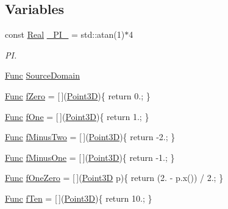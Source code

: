 \subsection*{Variables}
\begin{DoxyCompactItemize}
\item 
const \hyperlink{namespaceFVCode3D_a40c1f5588a248569d80aa5f867080e83}{Real} \hyperlink{namespaceFVCode3D_a10917df7e49a48239ce5f00ec9bbfe0a}{\+\_\+\+P\+I\+\_\+} = std\+::atan(1)$\ast$4
\begin{DoxyCompactList}\small\item\em PI. \end{DoxyCompactList}\item 
\hyperlink{namespaceFVCode3D_a38fa3b2520ad364d2c3d56ea5077826a}{Func} \hyperlink{namespaceFVCode3D_ae98a1f1ab0fce8db57176a4a9f91b2d0}{Source\+Domain}
\item 
\hyperlink{namespaceFVCode3D_a38fa3b2520ad364d2c3d56ea5077826a}{Func} \hyperlink{namespaceFVCode3D_a2e72cc81c6f214d6e057af7a02599501}{f\+Zero} = \mbox{[}$\,$\mbox{]}(\hyperlink{classFVCode3D_1_1Point3D}{Point3D})\{ return 0.; \}
\item 
\hyperlink{namespaceFVCode3D_a38fa3b2520ad364d2c3d56ea5077826a}{Func} \hyperlink{namespaceFVCode3D_a1a9ede09c77441d292a079fbab60fb82}{f\+One} = \mbox{[}$\,$\mbox{]}(\hyperlink{classFVCode3D_1_1Point3D}{Point3D})\{ return 1.; \}
\item 
\hyperlink{namespaceFVCode3D_a38fa3b2520ad364d2c3d56ea5077826a}{Func} \hyperlink{namespaceFVCode3D_aafe19d9d844e6d7ec5cc316a921b91ea}{f\+Minus\+Two} = \mbox{[}$\,$\mbox{]}(\hyperlink{classFVCode3D_1_1Point3D}{Point3D})\{ return -\/2.; \}
\item 
\hyperlink{namespaceFVCode3D_a38fa3b2520ad364d2c3d56ea5077826a}{Func} \hyperlink{namespaceFVCode3D_a2ce53aebcf9d64490c1d10fff4860a75}{f\+Minus\+One} = \mbox{[}$\,$\mbox{]}(\hyperlink{classFVCode3D_1_1Point3D}{Point3D})\{ return -\/1.; \}
\item 
\hyperlink{namespaceFVCode3D_a38fa3b2520ad364d2c3d56ea5077826a}{Func} \hyperlink{namespaceFVCode3D_a05f5ace5c7eed4784717659f36b087fe}{f\+One\+Zero} = \mbox{[}$\,$\mbox{]}(\hyperlink{classFVCode3D_1_1Point3D}{Point3D} p)\{ return (2. -\/ p.\+x()) / 2.; \}
\item 
\hyperlink{namespaceFVCode3D_a38fa3b2520ad364d2c3d56ea5077826a}{Func} \hyperlink{namespaceFVCode3D_ab998dd309f7a549b31ae669513c2039d}{f\+Ten} = \mbox{[}$\,$\mbox{]}(\hyperlink{classFVCode3D_1_1Point3D}{Point3D})\{ return 10.; \}
\item 

\end{DoxyCompactItemize}
